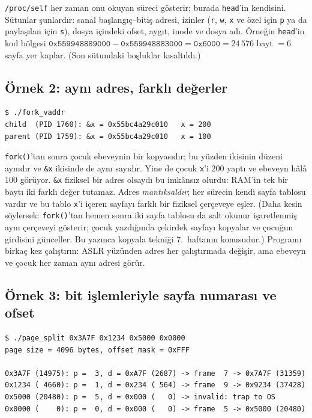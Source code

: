 \documentclass[11pt,a4paper]{article}
\newcommand{\cmd}[1]{\texttt{#1}}
\begin{document}
\texttt{/proc/self} her zaman onu okuyan süreci gösterir; burada \cmd{head}'in kendisini. Sütunlar şunlardır: sanal başlangıç--bitiş adresi, izinler (\texttt{r}, \texttt{w}, \texttt{x} ve özel için \texttt{p} ya da paylaşılan için \texttt{s}), dosya içindeki ofset, aygıt, inode ve dosya adı. Örneğin \cmd{head}'in kod bölgesi $\texttt{0x559948889000} - \texttt{0x559948883000} = \texttt{0x6000} = 24\,576$ bayt $= 6$ sayfa yer kaplar. (Son sütundaki boşluklar kısaltıldı.)

\subsection{Örnek 2: aynı adres, farklı değerler}



\begin{lstlisting}[style=term]
$ ./fork_vaddr
child  (PID 1760): &x = 0x55bc4a29c010   x = 200
parent (PID 1759): &x = 0x55bc4a29c010   x = 100
\end{lstlisting}

\cmd{fork()}'tan sonra çocuk ebeveynin bir kopyasıdır; bu yüzden ikisinin düzeni aynıdır ve \cmd{\&x} ikisinde de aynı sayıdır. Yine de çocuk \cmd{x}'i $200$ yaptı ve ebeveyn hâlâ $100$ görüyor. \cmd{\&x} fiziksel bir adres olsaydı bu imkânsız olurdu: RAM'in tek bir baytı iki farklı değer tutamaz. Adres \emph{mantıksaldır}; her sürecin kendi sayfa tablosu vardır ve bu tablo \cmd{x}'i içeren sayfayı farklı bir fiziksel çerçeveye eşler. (Daha kesin söylersek: \cmd{fork()}'tan hemen sonra iki sayfa tablosu da salt okunur işaretlenmiş aynı çerçeveyi gösterir; çocuk yazdığında çekirdek sayfayı kopyalar ve çocuğun girdisini günceller. Bu yazınca kopyala tekniği 7.~haftanın konusudur.) Programı birkaç kez çalıştırın: ASLR yüzünden adres her çalıştırmada değişir, ama ebeveyn ve çocuk her zaman aynı adresi görür.

\subsection{Örnek 3: bit işlemleriyle sayfa numarası ve ofset}



\begin{lstlisting}[style=term]
$ ./page_split 0x3A7F 0x1234 0x5000 0x0000
page size = 4096 bytes, offset mask = 0xFFF

0x3A7F (14975): p =  3, d = 0xA7F (2687) -> frame  7 -> 0x7A7F (31359)
0x1234 ( 4660): p =  1, d = 0x234 ( 564) -> frame  9 -> 0x9234 (37428)
0x5000 (20480): p =  5, d = 0x000 (   0) -> invalid: trap to OS
0x0000 (    0): p =  0, d = 0x000 (   0) -> frame  5 -> 0x5000 (20480)
\end{lstlisting}
\end{document}
